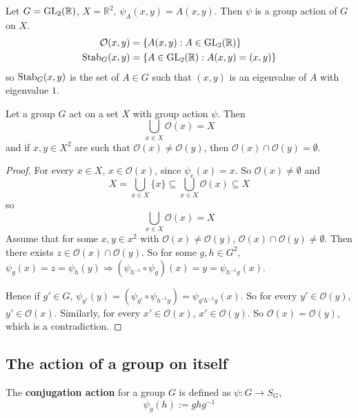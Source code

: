 \begin{example}
	Let $G = \text{GL}_2(\mathbb{R})$, $X = \mathbb{R}^2$, $\psi_A(x, y) = A(x, y)$. Then $\psi$ is a group action of $G$ on $X$.
	\[
		\begin{aligned}
			\mathcal{O}(x, y) & = \{ A(x, y): A \in \text{GL}_2(\mathbb{R}) \} \\
			\text{Stab}_G(x, y) & = \{ A \in \text{GL}_2(\mathbb{R}): A(x, y) = (x, y) \}
		\end{aligned}
	\]
	so $\text{Stab}_G(x, y)$ is the set of $A \in G$ such that $(x, y)$ is an eigenvalue of $A$ with eigenvalue $1$.
\end{example}

\begin{proposition}\label{prop:orbitsNotEqualImpliesEmptyIntersection}
	Let a group $G$ act on a set $X$ with group action $\psi$. Then
	\[
		\bigcup_{x \in X} \mathcal{O}(x) = X
	\]
	and if $x, y \in X^2$ are such that $\mathcal{O}(x) \ne \mathcal{O}(y)$, then $\mathcal{O}(x) \cap \mathcal{O}(y) = \emptyset$.
\end{proposition}

\begin{proof}
	For every $x \in X$, $x \in \mathcal{O}(x)$, since $\psi_e(x) = x$. So $\mathcal{O}(x) \ne \emptyset$ and
	\[
		X = \bigcup_{x \in X} \{ x \} \subseteq \bigcup_{x \in X} \mathcal{O}(x) \subseteq X
	\]
	so
	\[
		\bigcup_{x \in X} \mathcal{O}(x) = X
	\]
	Assume that for some $x, y \in x^2$ with $\mathcal{O}(x) \ne \mathcal{O}(y)$, $\mathcal{O}(x) \cap \mathcal{O}(y) \ne \emptyset$. Then there exists $z \in \mathcal{O}(x) \cap \mathcal{O}(y)$. So for some $g, h \in G^2$, $\psi_g(x) = z = \psi_h(y) \Longrightarrow (\psi_{h^{-1}} \circ \psi_g)(x) = y = \psi_{h^{-1} g} (x)$.

	Hence if $g' \in G$, $\psi_{g'}(y) = (\psi_{g'} \circ \psi_{h^{-1} g}) = \psi_{g' h^{-1} g} (x)$. So for every $y' \in \mathcal{O}(y)$, $y' \in \mathcal{O}(x)$. Similarly, for every $x' \in \mathcal{O}(x)$, $x' \in \mathcal{O}(y)$. So $\mathcal{O}(x) = \mathcal{O}(y)$, which is a contradiction.
\end{proof}

\subsection{The action of a group on itself}

\begin{definition}
	The \textbf{conjugation action} for a group $G$ is defined as $\psi: G \to S_G$,
	\[
		\psi_g(h) := ghg^{-1}
	\]
\end{definition}

